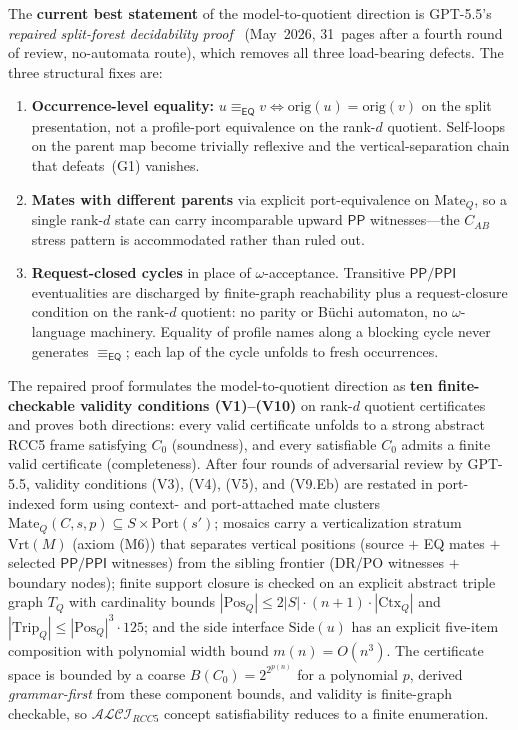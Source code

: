 \documentclass[
]{ceurart}
\theoremstyle{definition}
\newcommand{\ALCIRCC}[1]{\ensuremath{\mathcal{ALCI}_{\mathit{RCC#1}}}}
\newcommand{\EQ}{\ensuremath{\mathsf{EQ}}}
\newcommand{\PP}{\ensuremath{\mathsf{PP}}}
\newcommand{\PPI}{\ensuremath{\mathsf{PPI}}}
\begin{document}
The \textbf{current best statement} of the
model-to-quotient direction is GPT-5.5's
\textit{repaired split-forest decidability
proof}~\cite{GPT55Repaired} (May~2026, 31~pages after a fourth
round of review, no-automata route), which removes all three
load-bearing defects.  The three structural fixes are:
\begin{enumerate}[label=(\arabic*)]
  \item \textbf{Occurrence-level equality:}
    $u \equiv_{\EQ} v \Leftrightarrow \mathrm{orig}(u) =
    \mathrm{orig}(v)$ on the split presentation, not a
    profile-port equivalence on the rank-$d$ quotient.  Self-loops
    on the parent map become trivially reflexive and the
    vertical-separation chain that defeats~(G1) vanishes.
  \item \textbf{Mates with different parents} via
    explicit port-equivalence on $\mathrm{Mate}_Q$, so a single
    rank-$d$ state can carry incomparable upward $\PP$
    witnesses---the $C_{AB}$ stress pattern is accommodated rather
    than ruled out.
  \item \textbf{Request-closed cycles} in place of
    $\omega$-acceptance.  Transitive $\PP/\PPI$ eventualities are
    discharged by finite-graph reachability plus a request-closure
    condition on the rank-$d$ quotient: no parity or B\"uchi
    automaton, no $\omega$-language machinery.  Equality of
    profile names along a blocking cycle never generates
    $\equiv_{\EQ}$; each lap of the cycle unfolds to fresh
    occurrences.
\end{enumerate}
The repaired proof formulates the model-to-quotient direction as
\textbf{ten finite-checkable validity conditions
(V1)--(V10)} on rank-$d$ quotient certificates and proves both
directions: every valid certificate unfolds to a strong abstract
RCC5 frame satisfying $C_0$ (soundness), and every satisfiable
$C_0$ admits a finite valid certificate (completeness).  After
four rounds of adversarial review by GPT-5.5, validity conditions
(V3), (V4), (V5), and (V9.Eb) are restated in port-indexed form
using context- and port-attached mate clusters $\mathrm{Mate}_Q(C,
s, p) \subseteq S \times \mathrm{Port}(s')$; mosaics carry a
verticalization stratum $\mathrm{Vrt}(M)$ (axiom (M6)) that
separates vertical positions (source $+$ EQ mates $+$ selected
$\PP/\PPI$ witnesses) from the sibling frontier (DR/PO witnesses
$+$ boundary nodes); finite support closure is checked on an
explicit abstract triple graph $T_Q$ with cardinality bounds
$|\mathrm{Pos}_Q| \leq 2|S|\cdot(n{+}1)\cdot|\mathrm{Ctx}_Q|$ and
$|\mathrm{Trip}_Q| \leq |\mathrm{Pos}_Q|^3 \cdot 125$; and the
side interface $\mathrm{Side}(u)$ has an explicit five-item
composition with polynomial width bound $m(n) = O(n^3)$.  The
certificate space is bounded by a coarse
$B(C_0) = 2^{2^{p(n)}}$ for a polynomial $p$, derived
\emph{grammar-first} from these component bounds, and validity is
finite-graph checkable, so $\ALCIRCC{5}$ concept satisfiability
reduces to a finite enumeration.
\end{document}
